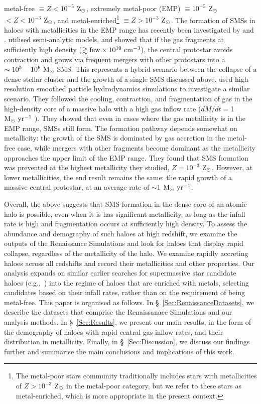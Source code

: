 \documentclass[graphics, twocolumn, usenatbib]{mn2e}
\newcommand{\msolaryr} {$\rm{M_{\odot}~yr^{-1}}~$}
\newcommand{\msolaryrc} {$\rm{M_{\odot}~yr^{-1}}$}
\newcommand{\zsolar} {$\rm{Z_{\odot}}~$}
\newcommand{\zsolarc} {$\rm{Z_{\odot}}$}
\begin{document}
metal-free $\equiv Z < 10^{-5}$ \zsolarc,
extremely metal-poor (EMP) $\equiv 10^{-5}$ \zsolar $< Z < 10^{-3}$ \zsolarc,
and metal-enriched\footnote{The metal-poor stars community traditionally includes stars with
  metallicities of $Z > 10^{-3}$ \zsolar in the metal-poor category, but we refer to these stars as metal-enriched, which 
  is more appropriate in the present context.} $\equiv Z > 10^{-3}$ \zsolarc. 
  The formation of SMSs in haloes with metallicities in the EMP range
  has recently been investigated by \cite{Tagawa_2020} and \cite{Chon_2020}. \cite{Tagawa_2020}  utilised semi-analytic models, and showed that if the gas fragments at sufficiently high density ($\gtrsim {\rm few}\times 10^{10}~{\rm cm^{-3}}$), the central protostar avoids contraction and  grows via frequent mergers with other protostars into a $\sim 10^5-10^6~{\rm M_\odot}$ SMS. This represents a hybrid scenario between the collapse of a dense stellar cluster and the growth of a single SMS discussed above.
   \cite{Chon_2020} used high-resolution smoothed particle
  hydrodynamics simulations to investigate a similar scenario. They followed the cooling, contraction, and fragmentation of gas in the high-density core of a massive halo with a high gas inflow rate ($dM/dt=$1~\msolaryr).  They showed that even in cases where the gas metallicity is in the EMP range, SMSs still form. The formation pathway depends somewhat on metallicity: the growth of the SMS is dominated by gas accretion in the metal-free case, while mergers with other fragments become dominant as the metallicity approaches the upper limit of the EMP range. They found that SMS formation was prevented at the highest metallicity they studied, $Z=10^{-3}$ \zsolarc. However, at lower metallicities, the end result remains the same: the rapid growth of a massive central protostar, at an average rate of $\sim$1 \msolaryrc.
  
Overall, the above suggests that SMS formation in the dense core of an atomic halo is possible, even when it is has significant metallicity, as long as the infall rate is high and fragmentation occurs at sufficiently high density.  
To assess the abundance and demography of such haloes at high redshift, we examine the outputs of the Renaissance Simulations
and look for haloes that display rapid collapse, regardless of the metallicity of the halo.
We examine rapidly accreting haloes across all redshifts and record their metallicities and other properties.
Our analysis expands on similar earlier searches for supermassive star candidate haloes
(e.g.,~\citealt{Habouzit_2016,Wise_2019,Regan_2020}) into the regime of haloes that are enriched with
metals, selecting candidates based on their infall rates, rather than on the requirement of being metal-free.
This paper is organised as follows.
In \S~\ref{Sec:RenaissanceDatasets}, we describe the datasets that comprise the Renaissanace Simulations
and our analysis methods.
In \S~\ref{Sec:Results}, we present  our main results, in the form of the demography of
haloes with rapid central gas inflow rates, and their distribution in metallicity.  
Finally, in \S~\ref{Sec:Discussion}, 
we discuss our findings further and summarise the main conclusions and implications of this work.
\end{document}
